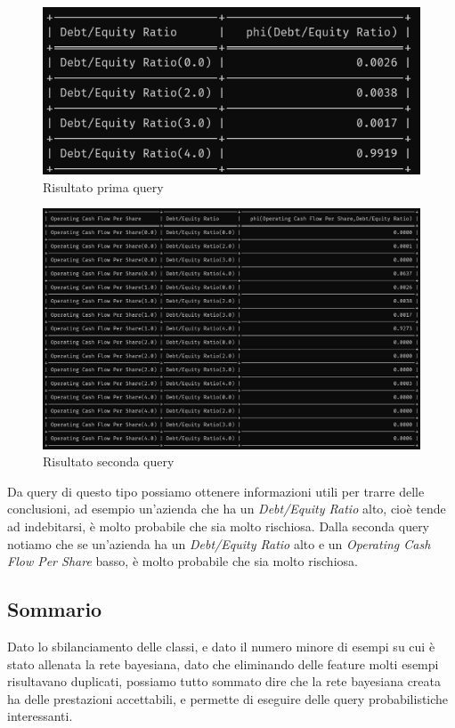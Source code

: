 \begin{figure}[H]
    \centering
    \includegraphics[scale=0.5]{img/firstq.png}
    \caption{Risultato prima query}
\end{figure}

\begin{figure}[H]
    \centering
    \includegraphics[scale=0.5]{img/secondq.png}
    \caption{Risultato seconda query}
\end{figure}

\noindent Da query di questo tipo possiamo ottenere informazioni utili per trarre delle conclusioni, ad esempio un'azienda che ha un \textit{Debt/Equity Ratio} alto, cioè tende ad indebitarsi, è molto probabile che sia molto rischiosa. Dalla seconda query notiamo che se un'azienda ha un \textit{Debt/Equity Ratio} alto e un \textit{Operating Cash Flow Per Share} basso, è molto probabile che sia molto rischiosa.

\subsection{Sommario}

\noindent Dato lo sbilanciamento delle classi, e dato il numero minore di esempi su cui è stato allenata la rete bayesiana, dato che eliminando delle feature molti esempi risultavano duplicati, possiamo tutto sommato dire che la rete bayesiana creata ha delle prestazioni accettabili, e permette di eseguire delle query probabilistiche interessanti.